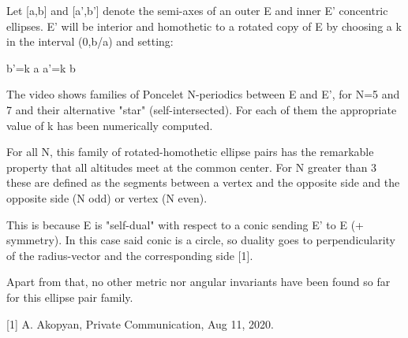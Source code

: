 Let [a,b] and [a',b'] denote the semi-axes of an outer E and inner E' concentric ellipses. E' will be interior and homothetic to a rotated copy of E by choosing a k in the interval (0,b/a) and setting:

b'=k a
a'=k b

The video shows families of Poncelet N-periodics between  E and E', for N=5 and 7 and their alternative "star" (self-intersected). For each of them the appropriate value of k has been numerically computed.

For all N, this family of rotated-homothetic ellipse pairs has the remarkable property that all altitudes meet at the common center. For N greater than 3 these are defined as the segments between a vertex and the opposite side and the opposite side (N odd) or vertex (N even). 

This is because E is "self-dual" with respect to a conic sending E' to E (+ symmetry). In this case said conic is a circle, so duality goes to perpendicularity of the radius-vector and the corresponding side [1].

Apart from that, no other metric nor angular invariants have been found so far for this ellipse pair family.

[1] A. Akopyan, Private Communication, Aug 11, 2020.